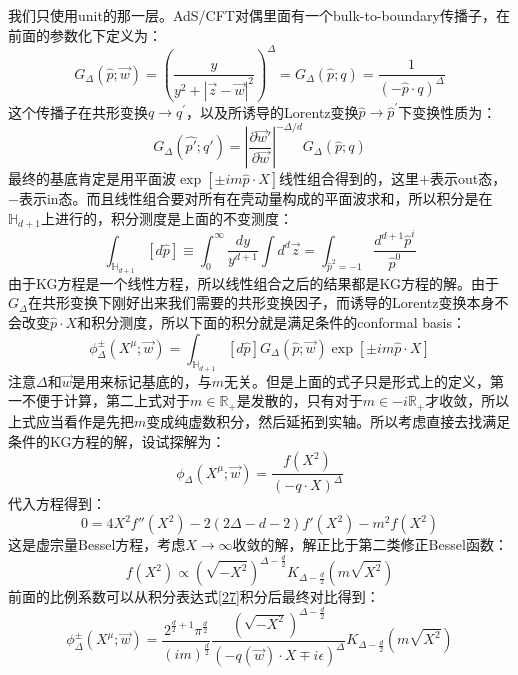 我们只使用unit的那一层。AdS/CFT对偶里面有一个bulk-to-boundary传播子，在前面的参数化下定义为\cite{Witten:1998qj}：
\begin{equation}
	\boxed{
	G_\Delta(\hat{p};\vec{w})=\left(\frac{y}{y^2+|\vec{z}-\vec{w}|^2}\right)^\Delta =G_\Delta(\hat{p};q)=\frac{1}{(-\hat{p}\cdot q)^\Delta}
	}
\end{equation}
这个传播子在共形变换$q\to q^\prime$，以及所诱导的Lorentz变换$\hat p\to\hat p^\prime$下变换性质为：
\begin{equation}
	G_\Delta(\hat{p'};q')=\left|\frac{\partial\vec{w}'}{\partial\vec{w}}\right|^{-\Delta/d}G_\Delta(\hat{p};q)
\end{equation}
最终的基底肯定是用平面波$\exp\left[\pm im\hat{p}\cdot X\right]$线性组合得到的，这里$+$表示out态，$-$表示in态。而且线性组合要对所有在壳动量构成的平面波求和，所以积分是在$\mathbb{H}_{d+1}$上进行的，积分测度是上面的不变测度：
\begin{equation}
	\int_{\mathbb{H}_{d+1}}[d\hat{p}]\equiv\int_0^\infty\frac{dy}{y^{d+1}}\int d^d\vec{z}=\int_{\hat p^2=-1}\frac{d^{d+1}\hat{p}^i}{\hat{p}^0}
\end{equation}
由于KG方程是一个线性方程，所以线性组合之后的结果都是KG方程的解。由于$G_\Delta$在共形变换下刚好出来我们需要的共形变换因子，而诱导的Lorentz变换本身不会改变$\hat p \cdot X$和积分测度，所以下面的积分就是满足条件的conformal basis：
\begin{equation}\label{27}
	\boxed{
	\phi_\Delta^\pm(X^\mu;\vec{w})=\int_{\mathbb{H}_{d+1}}[d\hat{p}]G_\Delta(\hat{p};\vec{w})\exp\left[\pm im\hat{p}\cdot X\right]
	}
\end{equation}
注意$\Delta$和$\vec{w}$是用来标记基底的，与$m$无关。但是上面的式子只是形式上的定义，第一不便于计算，第二上式对于$m\in\mathbb{R}_+$是发散的，只有对于$m\in-i{\mathbb{R}_+}$才收敛，所以上式应当看作是先把$m$变成纯虚数积分，然后延拓到实轴。所以考虑直接去找满足条件的KG方程的解，设试探解为：
\begin{equation}
	\phi_\Delta(X^\mu;\vec{w})=\frac{f(X^2)}{(-q\cdot X)^\Delta}
\end{equation}
代入方程得到：
\begin{equation}
	0=4X^2f''(X^2)-2(2\Delta-d-2)f'(X^2)-m^2f(X^2)
\end{equation}
这是虚宗量Bessel方程，考虑$X\to\infty$收敛的解，解正比于第二类修正Bessel函数：
\[f(X^2)\propto\left(\sqrt{-X^2}\right)^{\Delta-\frac{d}{2}}K_{\Delta-\frac{d}{2}}\left(m\sqrt{X^2}\right)\]
前面的比例系数可以从积分表达式\ref{27}积分后最终对比得到：
\begin{equation}
	\phi_\Delta^\pm(X^\mu;\vec{w})=\frac{2^{\frac d2+1}\pi^{\frac d2}}{(im)^{\frac d2}}\frac{(\sqrt{-X^2})^{\Delta-\frac d2}}{(-q(\vec{w})\cdot X\mp i\epsilon)^\Delta}K_{\Delta-\frac d2}(m\sqrt{X^2})
\end{equation}
